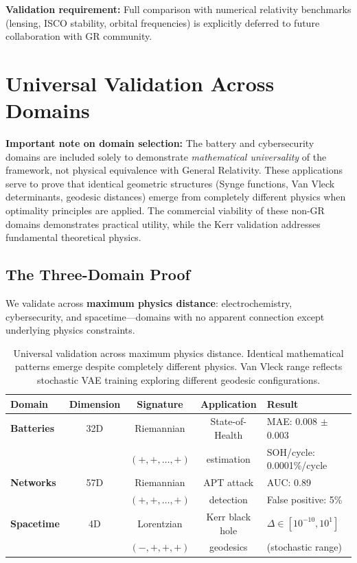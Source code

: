 \documentclass[11pt,a4paper]{article}
\begin{document}
\textbf{Validation requirement:} Full comparison with numerical relativity benchmarks (lensing, ISCO stability, orbital frequencies) is explicitly deferred to future collaboration with GR community.

\section{Universal Validation Across Domains}

\textbf{Important note on domain selection:} The battery and cybersecurity domains are included solely to demonstrate \emph{mathematical universality} of the framework, not physical equivalence with General Relativity. These applications serve to prove that identical geometric structures (Synge functions, Van Vleck determinants, geodesic distances) emerge from completely different physics when optimality principles are applied. The commercial viability of these non-GR domains demonstrates practical utility, while the Kerr validation addresses fundamental theoretical physics.

\subsection{The Three-Domain Proof}

We validate across \textbf{maximum physics distance}: electrochemistry, cybersecurity, and spacetime—domains with no apparent connection except underlying physics constraints.

\begin{table}[h]
\centering
\small
\begin{tabular}{lcccl}
\toprule
\textbf{Domain} & \textbf{Dimension} & \textbf{Signature} & \textbf{Application} & \textbf{Result} \\
\midrule
\textbf{Batteries} & 32D & Riemannian & State-of-Health & MAE: 0.008 $\pm$ 0.003 \\
 & & $(+,+,\ldots,+)$ & estimation & SOH/cycle: 0.0001\%/cycle \\
\midrule
\textbf{Networks} & 57D & Riemannian & APT attack & AUC: 0.89 \\
 & & $(+,+,\ldots,+)$ & detection & False positive: 5\% \\
\midrule
\textbf{Spacetime} & 4D & Lorentzian & Kerr black hole & $\Delta \in [10^{-10}, 10^{1}]$ \\
 & & $(-,+,+,+)$ & geodesics & (stochastic range) \\
\bottomrule
\end{tabular}
\caption{Universal validation across maximum physics distance. Identical mathematical patterns emerge despite completely different physics. Van Vleck range reflects stochastic VAE training exploring different geodesic configurations.}
\end{table}
\end{document}
